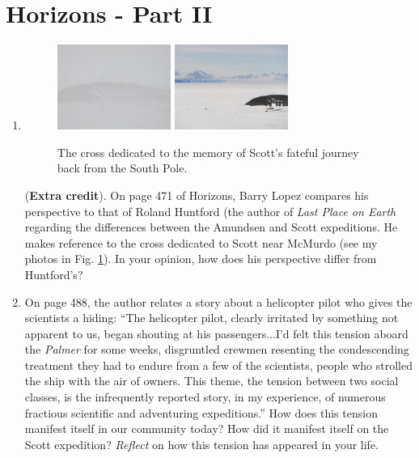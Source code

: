 \documentclass{article}
\begin{document}
\section{Horizons - Part II}

\begin{enumerate}
\item 
\begin{figure}[hb]
\centering
\includegraphics[width=0.35\textwidth]{cross1.jpg}
\includegraphics[width=0.35\textwidth]{cross2.jpg}
\caption{\label{fig:cross} The cross dedicated to the memory of Scott's fateful journey back from the South Pole.}
\end{figure}
(\textbf{Extra credit}).  	On page 471 of Horizons, Barry Lopez compares his perspective to that of Roland Huntford (the author of \textit{Last Place on Earth} regarding the differences between the Amundsen and Scott expeditions.  He makes reference to the cross dedicated to Scott near McMurdo (see my photos in Fig. \ref{fig:cross}).  In your opinion, how does his perspective differ from Huntford's? \\ \vspace{2cm}
\item On page 488, the author relates a story about a helicopter pilot who gives the scientists a hiding: ``The helicopter pilot, clearly irritated by something not apparent to us, began shouting at his passengers...I'd felt this tension aboard the \textit{Palmer} for some weeks, disgruntled crewmen resenting the condescending treatment they had to endure from a few of the scientists, people who strolled the ship with the air of owners.  This theme, the tension between two social classes, is the infrequently reported story, in my experience, of numerous fractious scientific and adventuring expeditions.''  How does this tension manifest itself in our community today?  How did it manifest itself on the Scott expedition?  \textit{Reflect} on how this tension has appeared in your life. \\ \vspace{4cm}

\end{enumerate}
\end{document}
